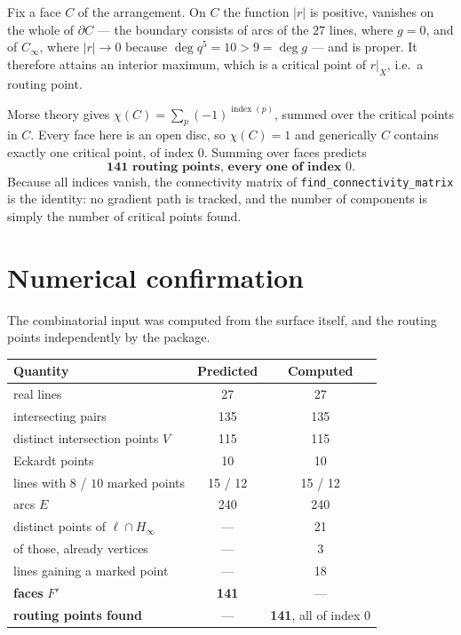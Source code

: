 \documentclass[11pt]{article}
\newcommand{\Cinf}{C_\infty}
\newcommand{\Hinf}{H_\infty}
\begin{document}
Fix a face $C$ of the arrangement. On $C$ the function $|r|$ is positive, vanishes
on the whole of $\partial C$ --- the boundary consists of arcs of the $27$ lines,
where $g=0$, and of $\Cinf$, where $|r|\to 0$ because $\deg q^5=10>9=\deg g$ ---
and is proper. It therefore attains an interior maximum, which is a critical point
of $r|_X$, i.e.\ a routing point.

Morse theory gives $\chi(C)=\sum_p(-1)^{\operatorname{index}(p)}$, summed over the
critical points in $C$. Every face here is an open disc, so $\chi(C)=1$ and
generically $C$ contains exactly one critical point, of index $0$. Summing over
faces predicts
\[
  \textbf{141 routing points, every one of index } 0 .
\]
Because all indices vanish, the connectivity matrix of
\texttt{find\_connectivity\_matrix} is the identity: no gradient path is tracked,
and the number of components is simply the number of critical points found.

\section{Numerical confirmation}

The combinatorial input was computed from the surface itself, and the routing
points independently by the package.

\begin{center}
\begin{tabular}{lcc}
\toprule
Quantity & Predicted & Computed \\
\midrule
real lines                              & 27  & 27 \\
intersecting pairs                      & 135 & 135 \\
distinct intersection points $V$        & 115 & 115 \\
Eckardt points                          & 10  & 10 \\
lines with $8$ / $10$ marked points     & 15 / 12 & 15 / 12 \\
arcs $E$                                & 240 & 240 \\
\midrule
distinct points of $\ell\cap\Hinf$      & --- & 21 \\
of those, already vertices              & --- & 3 \\
lines gaining a marked point            & --- & 18 \\
\midrule
\textbf{faces} $F'$                     & \textbf{141} & --- \\
\textbf{routing points found}           & ---          & \textbf{141}, all of index $0$ \\
\bottomrule
\end{tabular}
\end{center}
\end{document}
